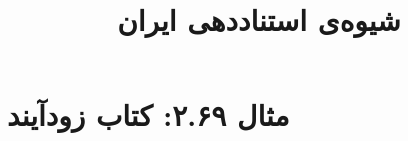 \documentclass[a4paper,10pt]{article}
\begin{document}
\title{شیوه‌ی استناددهی ایران
 }
\author{}
\date{}
\maketitle



\section*{مثال ۲.۶۹: کتاب زودآیند}

\cite{علیدوستی}\\
\cite{thompson}\\






\end{document}
